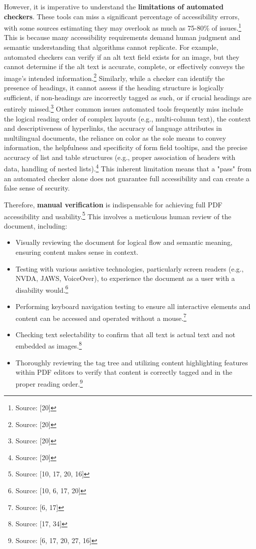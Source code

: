 However, it is imperative to understand the \textbf{limitations of automated checkers}. These tools can miss a significant percentage of accessibility errors, with some sources estimating they may overlook as much as 75-80\% of issues.\footnote{Source: [20]} This is because many accessibility requirements demand human judgment and semantic understanding that algorithms cannot replicate. For example, automated checkers can verify if an alt text field exists for an image, but they cannot determine if the alt text is accurate, complete, or effectively conveys the image's intended information.\footnote{Source: [20]} Similarly, while a checker can identify the presence of headings, it cannot assess if the heading structure is logically sufficient, if non-headings are incorrectly tagged as such, or if crucial headings are entirely missed.\footnote{Source: [20]} Other common issues automated tools frequently miss include the logical reading order of complex layouts (e.g., multi-column text), the context and descriptiveness of hyperlinks, the accuracy of language attributes in multilingual documents, the reliance on color as the sole means to convey information, the helpfulness and specificity of form field tooltips, and the precise accuracy of list and table structures (e.g., proper association of headers with data, handling of nested lists).\footnote{Source: [20]} This inherent limitation means that a "pass" from an automated checker alone does not guarantee full accessibility and can create a false sense of security.

Therefore, \textbf{manual verification} is indispensable for achieving full PDF accessibility and usability.\footnote{Source: [10, 17, 20, 16]} This involves a meticulous human review of the document, including:
\begin{itemize}[noitemsep,topsep=0pt]
    \item Visually reviewing the document for logical flow and semantic meaning, ensuring content makes sense in context.
    \item Testing with various assistive technologies, particularly screen readers (e.g., NVDA, JAWS, VoiceOver), to experience the document as a user with a disability would.\footnote{Source: [10, 6, 17, 20]}
    \item Performing keyboard navigation testing to ensure all interactive elements and content can be accessed and operated without a mouse.\footnote{Source: [6, 17]}
    \item Checking text selectability to confirm that all text is actual text and not embedded as images.\footnote{Source: [17, 34]}
    \item Thoroughly reviewing the tag tree and utilizing content highlighting features within PDF editors to verify that content is correctly tagged and in the proper reading order.\footnote{Source: [6, 17, 20, 27, 16]}
\end{itemize}

